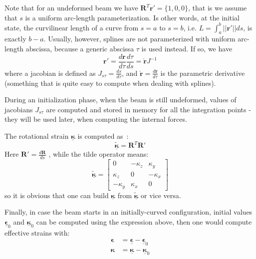 \documentclass[review]{elsarticle}
\def\avect#1{{\boldsymbol{#1}}}
\def\amatr#1{{\boldsymbol{#1}}}
\begin{document}
Note that for an
undeformed beam we have $\amatr{R}^T\avect{r}' = \{1,0,0\}$, that is we assume that $s$ 
is a uniform arc-length parameterization. Is other words, at the initial state,
the curvilinear length of a curve from $s=a$ to $s=b$, i.e. $L=\int^b_a ||\avect{r}'||ds$, is exactly $b-a$. Usually, 
however, splines are not parameterized with uniform arc-length abscissa, because a 
generic abscissa $\tau$ is used instead. If so, we have  
%
\begin{equation}
\avect{r}' = \frac{d\avect{r}}{d\tau} \frac{d\tau}{ds} = \mathring{\avect{r}} J^{-1}
\end{equation}
%
where a jacobian is defined as $J_{s\tau} = \frac{ds}{d\tau}$, and $\mathring{\avect{r}} =\frac{d\avect{r}}{d\tau}$ is the parametric derivative (something that is quite easy to compute when dealing with splines).

During an initialization phase, when the beam is still undeformed, values of jacobians $J_{s\tau}$ are computed and stored in memory for all the integration points - they will be used later, when computing the internal forces.

The rotational strain  $\underline{\avect{\kappa}}$ is computed as~\cite{Weeger2017IGA}:
%
\begin{equation}
	\tilde{\underline{\avect{\kappa}}} = \amatr{R}^T \amatr{R}'
\end{equation}
%
Here $\amatr{R}' = \frac{d\amatr{R}}{ds}$ , while the tilde operator means:
%
\begin{equation}
	\tilde{\underline{\avect{\kappa}}} = 
	\left[  
	\begin{array}{ccc}
	 0 & -\kappa_z & \kappa_y \\
	 \kappa_z & 0 & -\kappa_x \\
	 -\kappa_y & \kappa_x & 0 
	\end{array}
	\right]
\end{equation}
%
so it is obvious that one can build $\underline{\avect{\kappa}}$ from $\tilde{\underline{\avect{\kappa}}}$ or vice versa.

Finally, in case the beam starts in an initially-curved configuration, initial values $\underline{\avect{\epsilon}}_0$ and $\underline{\avect{\kappa}}_0$ can be computed using the expression above, then one would compute effective strains with:
%
\begin{align}
	\avect{\epsilon} &= \underline{\avect{\epsilon}} - \underline{\avect{\epsilon}}_0 \\
	\avect{\kappa}   &= \underline{\avect{\kappa}} - \underline{\avect{\kappa}}_0 
\end{align}
\end{document}
